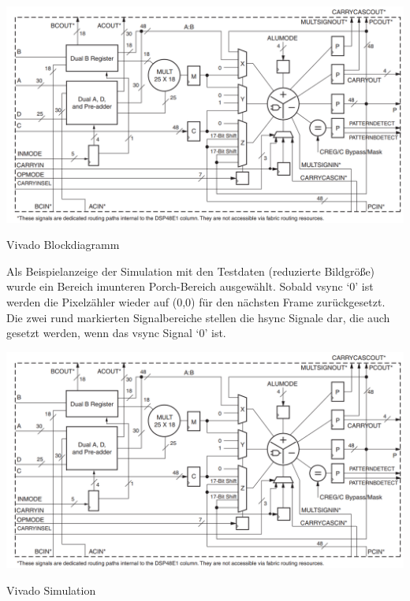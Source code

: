 \begin{minipage}{\textwidth}
    \begin{center}        
        \includegraphics[scale=0.5]{img/DSP48e.png} 
    \end{center}
\end{minipage}
\begin{center}
Vivado Blockdiagramm
\end{center}

Als Beispielanzeige der Simulation mit den Testdaten (reduzierte Bildgröße) wurde ein  Bereich imunteren Porch-Bereich ausgewählt. Sobald vsync `0' ist werden die Pixelzähler wieder auf (0,0) für den nächsten Frame zurückgesetzt. Die zwei rund markierten Signalbereiche stellen die hsync Signale dar, die auch gesetzt werden, wenn das vsync Signal `0' ist. \\

\begin{minipage}{\textwidth}
    \begin{center}        
        \includegraphics[scale=0.4]{img/DSP48e.png} 
    \end{center}
\end{minipage}
\begin{center}
Vivado Simulation
\end{center}


